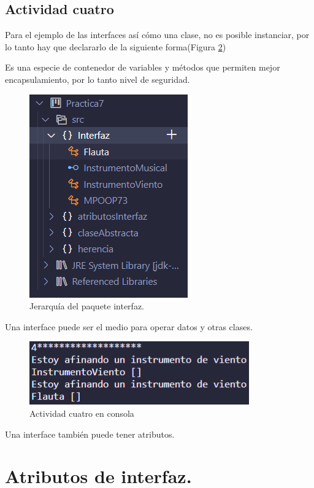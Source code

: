 \documentclass[conference]{IEEEtran}
\begin{document}
        \subsection{Actividad cuatro}

        Para el ejemplo de las interfaces así cómo una clase, no es posible instanciar, por lo tanto hay que declararlo de la siguiente forma(Figura \ref{fig10})

        Es una especie de contenedor de variables y métodos que permiten mejor encapsulamiento, por lo tanto nivel de seguridad.

        \begin{figure}[htbp]
            \centerline{\includegraphics[scale=0.4]{./pics/13}}
            \caption{Jerarquía del paquete interfaz.}
            \label{fig9}
        \end{figure}

        Una interface puede ser el medio para operar datos y otras clases. 

        \begin{figure}[htbp]
            \centerline{\includegraphics[scale=0.6]{./pics/14}}
            \caption{Actividad cuatro en consola}
            \label{fig10}
        \end{figure}

        Una interface también puede tener atributos.

    \section{Atributos de interfaz.}
\end{document}

